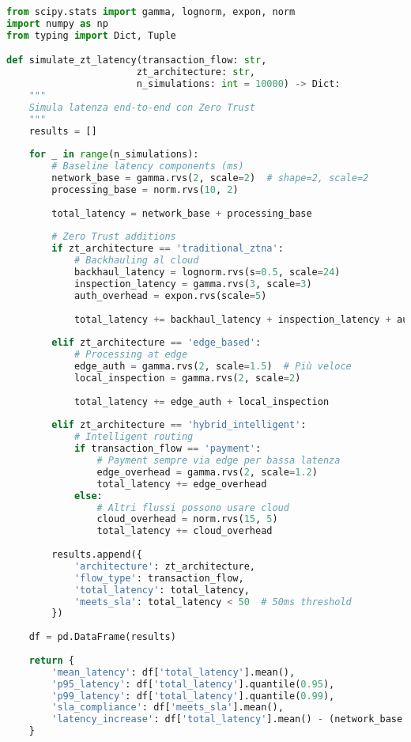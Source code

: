 \begin{lstlisting}[language=Python, caption=Simulazione Impatto Latenza Zero Trust]
from scipy.stats import gamma, lognorm, expon, norm
import numpy as np
from typing import Dict, Tuple

def simulate_zt_latency(transaction_flow: str, 
                       zt_architecture: str,
                       n_simulations: int = 10000) -> Dict:
    """
    Simula latenza end-to-end con Zero Trust
    """
    results = []
    
    for _ in range(n_simulations):
        # Baseline latency components (ms)
        network_base = gamma.rvs(2, scale=2)  # shape=2, scale=2
        processing_base = norm.rvs(10, 2)
        
        total_latency = network_base + processing_base
        
        # Zero Trust additions
        if zt_architecture == 'traditional_ztna':
            # Backhauling al cloud
            backhaul_latency = lognorm.rvs(s=0.5, scale=24)
            inspection_latency = gamma.rvs(3, scale=3)
            auth_overhead = expon.rvs(scale=5)
            
            total_latency += backhaul_latency + inspection_latency + auth_overhead
            
        elif zt_architecture == 'edge_based':
            # Processing at edge
            edge_auth = gamma.rvs(2, scale=1.5)  # Più veloce
            local_inspection = gamma.rvs(2, scale=2)
            
            total_latency += edge_auth + local_inspection
            
        elif zt_architecture == 'hybrid_intelligent':
            # Intelligent routing
            if transaction_flow == 'payment':
                # Payment sempre via edge per bassa latenza
                edge_overhead = gamma.rvs(2, scale=1.2)
                total_latency += edge_overhead
            else:
                # Altri flussi possono usare cloud
                cloud_overhead = norm.rvs(15, 5)
                total_latency += cloud_overhead
        
        results.append({
            'architecture': zt_architecture,
            'flow_type': transaction_flow,
            'total_latency': total_latency,
            'meets_sla': total_latency < 50  # 50ms threshold
        })
    
    df = pd.DataFrame(results)
    
    return {
        'mean_latency': df['total_latency'].mean(),
        'p95_latency': df['total_latency'].quantile(0.95),
        'p99_latency': df['total_latency'].quantile(0.99),
        'sla_compliance': df['meets_sla'].mean(),
        'latency_increase': df['total_latency'].mean() - (network_base + processing_base)
    }
\end{lstlisting}

